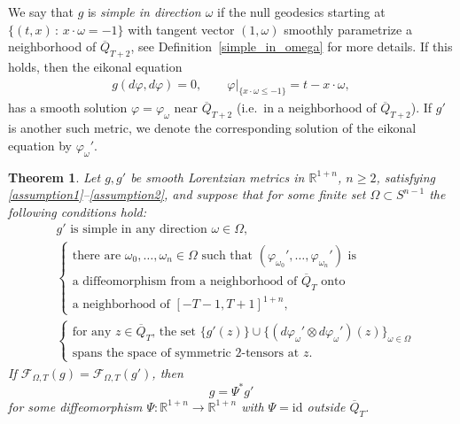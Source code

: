 \documentclass[11pt,letterpaper]{amsart}
\newtheorem{Theorem}{Theorem}[section]
\theoremstyle{definition}
\numberwithin{equation}{section}
\newcommand{\mR}{\mathbb{R}}                    %
\newcommand{\ol}[1]{\overline{#1}}
\newcommand{\id}{\mathrm{id}}
\newcommand{\gm}{g_{\mathrm{Min}}}
\begin{document}
We say that $g$ is \emph{simple in direction $\omega$} if the null geodesics starting at $\{ (t,x) \,:\, x \cdot \omega = -1 \}$ with tangent vector $(1,\omega)$ smoothly parametrize a neighborhood of $\ol{Q}_{T+2}$, see Definition~\ref{simple_in_omega} for more details. If this holds, then the eikonal equation 
    \begin{align*} %
g(d\varphi, d\varphi) = 0, \qquad \varphi|_{\{ x \cdot \omega \leq -1 \}} = t-x \cdot \omega,
    \end{align*}
has a smooth solution $\varphi = \varphi_{\omega}$ near $\ol{Q}_{T+2}$ (i.e.\ in a neighborhood of $\ol{Q}_{T+2}$). If $g'$ is another such metric, we denote the corresponding solution of the eikonal equation by $\varphi_{\omega}'$. %

\begin{Theorem} \label{thm_main2}
Let $g, g'$ be smooth Lorentzian metrics  in $\mR^{1+n}$, $n \ge 2$, satisfying \eqref{assumption1}--\eqref{assumption2}, and suppose that for some finite set $\Omega \subset S^{n-1}$ the following conditions hold:
\begin{align}
 &\text{$g'$ is simple in any direction $\omega \in \Omega$}, \label{assumption3} \\[4pt]
 & \left\{ \begin{array}{c}
 \text{there are $\omega_0, \ldots, \omega_n \in \Omega$ such that $(\varphi_{\omega_0}', \ldots, \varphi_{\omega_n}')$ is} \\ 
 \text{a diffeomorphism from a neighborhood of $\ol{Q}_T$ onto} \\
 \text{a neighborhood of $[-T-1,T+1]^{1+n}$}, \end{array} \right. \label{assumption4}  \\[4pt]
  & \left\{ \begin{array}{c}
  \text{for any $z \in \ol{Q}_T$, the set $\{ g'(z) \} \cup \{ (d\varphi_{\omega}' \otimes d\varphi_{\omega}')(z) \}_{\omega \in \Omega}$} \\
  \text{spans the space of symmetric $2$-tensors at $z$.} \end{array} \right. \label{assumption5} 
\end{align}
If $\mathcal{F}_{\Omega,T}(g) = \mathcal{F}_{\Omega,T}(g')$, then  
\[
g = \Psi^* g'
\]
for some diffeomorphism $\Psi: \mR^{1+n} \to \mR^{1+n}$ with $\Psi = \id$ outside $\ol{Q}_T$.
\end{Theorem}
\end{document}
